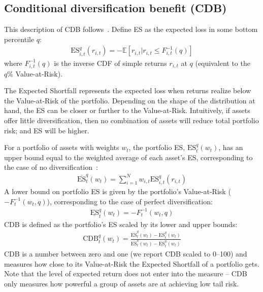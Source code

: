
\subsection{Conditional diversification benefit (CDB)} %
\label{sub:conditional_diversification_benefit}

This description of CDB follows~\textcite{ChristoffersenErrunzaJacobLanglois2012}. Define ES as the expected loss in some bottom percentile $q$:
\begin{align}
    \text{ES}_{i,t}^q(r_{i,t}) = -\mathbb{E}[r_{i,t} | r_{i,t} \leq F_{i,t}^{-1}(q)]
\end{align}
where $F_{i,t}^{-1}(q)$ is the inverse CDF of simple returns $r_{i,t}$ at $q$ (equivalent to the $q\%$ Value-at-Risk). 

The Expected Shortfall represents the expected loss when returns realize below the Value-at-Risk of the portfolio. Depending on the shape of the distribution at hand, the ES can be closer or further to the Value-at-Risk. Intuitively, if assets offer little diversification, then no combination of assets will reduce total portfolio risk; and ES will be higher. 

For a portfolio of assets with weights $w_t$, the portfolio ES, $\text{ES}_t^q(w_t)$, has an upper bound equal to the weighted average of each asset's ES, corresponding to the case of no diversification~\autocite{Artzner1999}:
\begin{align}
  \overline{\text{ES}}_t^q(w_t) = \sum_{i=1}^N w_{i,t} \text{ES}_{i,t}^q(r_{i,t})
\end{align}
A lower bound on portfolio ES is given by the portfolio's Value-at-Risk ($-F_{t}^{-1}(w_t, q)$), corresponding to the case of perfect diversification:
\begin{align}
  \underline{\text{ES}}_t^q(w_t) = -F_{t}^{-1}(w_t, q)
\end{align}
CDB is defined as the portfolio's ES scaled by its lower and upper bounds:
\begin{align}
  \text{CDB}_t^q(w_t) = \frac{\overline{\text{ES}}_t^q(w_t) - \text{ES}_t^q(w_t)}{\overline{\text{ES}}_t^q(w_t) - \underline{\text{ES}}_t^q(w_t)}
\end{align}
CDB is a number between zero and one (we report CDB scaled to 0--100) and measures how close to its Value-at-Risk the Expected Shortfall of a portfolio gets. Note that the level of expected return does not enter into the measure -- CDB only measures how powerful a group of assets are at achieving low tail risk.

